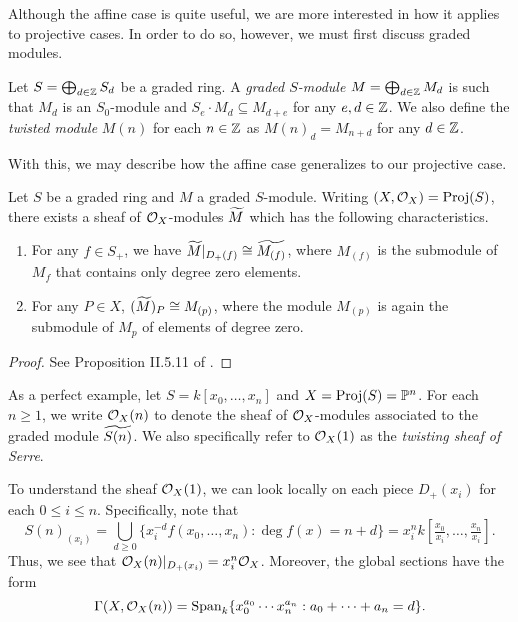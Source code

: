Although the affine case is quite useful,
we are more interested in how it applies to projective cases.
In order to do so, however,
we must first discuss graded modules.

\begin{definition}
    Let $S = \bigoplus_{d \in \mathbb{Z}} S_d$ be a graded ring.
    A \textit{graded $S$-module} $M = \bigoplus_{d \in \mathbb{Z}} M_d$ is such that $M_d$ is an $S_0$-module 
    and $S_e \cdot M_d \subseteq M_{d + e}$ for any $e, d \in \mathbb{Z}$.
    We also define the \textit{twisted module} $M(n)$ for each $n \in \mathbb{Z}$ as $M(n)_d = M_{n + d}$ for any $d \in \mathbb{Z}$.
\end{definition}

With this, we may describe how the affine case generalizes to our projective case.

\begin{proposition}
    Let $S$ be a graded ring and $M$ a graded $S$-module.
    Writing $(X, \mathcal{O}_X) = {\rm Proj}(S)$,
    there exists a sheaf of $\mathcal{O}_X$-modules $\widetilde M$
    which has the following characteristics.
    \begin{enumerate}
        \item For any $f \in S_+$,
        we have $\widetilde M|_{D_+(f)} \cong \widetilde{M_{(f)}}$,
        where $M_{(f)}$ is the submodule of $M_f$ that contains only degree zero elements.
        \item For any $P \in X$, $(\widetilde M)_P \cong M_{(p)}$,
        where the module $M_{(p)}$ is again the submodule of $M_p$ of elements of degree zero. 
    \end{enumerate} 
\end{proposition}
\begin{proof}
    See Proposition II.5.11 of \cite{Hartshorne_2013}.
\end{proof}

\begin{example}
    As a perfect example, let $S = k[x_0, \ldots, x_n]$ and $X = {\rm Proj}(S) = \mathbb{P}^n$.
    For each $n \geq 1$, we write $\mathcal{O}_X(n)$ to denote the sheaf of $\mathcal{O}_X$-modules associated to the graded module $\widetilde{S(n)}$.
    We also specifically refer to $\mathcal{O}_X(1)$ as the \textit{twisting sheaf of Serre}.
    
    To understand the sheaf $\mathcal{O}_X(1)$,
    we can look locally on each piece $D_+(x_i)$ for each $0 \leq i \leq n$.
    Specifically, note that
    \[
        S(n)_{(x_i)}
        = \bigcup_{d \geq 0}\{
            x_i^{-d}f(x_0, \ldots, x_n) : \deg f(x) = n + d
        \}
        = x_i^n k[\tfrac{x_0}{x_i}, \ldots, \tfrac{x_n}{x_i}].
    \]
    Thus, we see that $\mathcal{O}_X(n)|_{D_+(x_i)} = x_i^n \mathcal{O}_X$.
    Moreover, the global sections have the form
    \[
        \Gamma(X, \mathcal{O}_X(n)) = {\rm Span}_k\{
            x_0^{a_0} \cdots x_n^{a_n} : 
            a_0 + \cdots + a_n = d
        \}.
    \]
\end{example}

